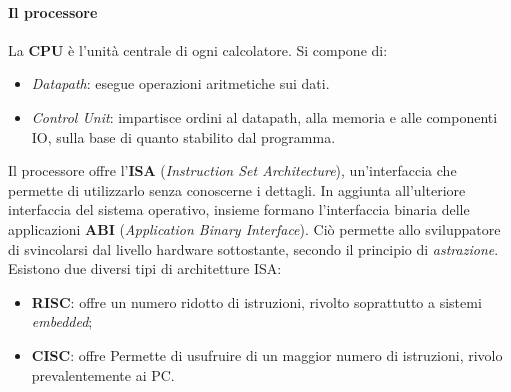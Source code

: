 \paragraph*{Il processore}
La \textbf{CPU} è l'unità centrale di ogni calcolatore. Si compone di:
\begin{itemize}[noitemsep]
	\item \textit{Datapath}: esegue operazioni aritmetiche sui dati.
	\item \textit{Control Unit}: impartisce ordini al datapath, alla memoria e alle componenti IO, sulla base di quanto stabilito dal programma.
\end{itemize}
Il processore offre l'\textbf{ISA} (\textit{Instruction Set Architecture}), un'interfaccia che permette di utilizzarlo senza conoscerne i dettagli. In aggiunta all'ulteriore interfaccia del sistema operativo, insieme formano l'interfaccia binaria delle applicazioni \textbf{ABI} (\textit{Application Binary Interface}). Ciò permette allo sviluppatore di svincolarsi dal livello hardware sottostante, secondo il principio di \textit{astrazione}.\\ Esistono due diversi tipi di architetture ISA:
\begin{itemize}[noitemsep,nolistsep]
	\item \textbf{RISC}: offre un numero ridotto di istruzioni, rivolto soprattutto a sistemi \textit{embedded};
	\item \textbf{CISC}: offre Permette di usufruire di un maggior numero di istruzioni, rivolo prevalentemente ai PC.
\end{itemize}

